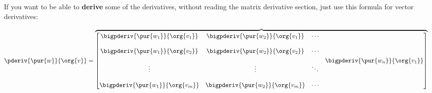         If you want to be able to \textbf{derive} some of the derivatives, without reading the matrix derivative section, just use this formula for vector derivatives:
        
        \begin{equation}
                \pderiv{ \pur{w} }{ \org{v} } 
                =
                \overbrace{
                    \begin{bmatrix}
                        \begin{matrix}
                            \bigpderiv{ \pur{w_1} }   { \org{v_1} }\\ 
                            \\
                            \bigpderiv{ \pur{w_1} }   { \org{v_2} }\\ 
                            \\
                            \vdots \\ 
                            \\
                            \bigpderiv{ \pur{w_1} }   { \org{v_m} }
                        \end{matrix} &
                        \begin{matrix}
                            \bigpderiv{ \pur{w_2} }   { \org{v_1} }\\ 
                            \\
                            \bigpderiv{ \pur{w_2} }   { \org{v_2} }\\ 
                            \\
                            \vdots \\ 
                            \\
                            \bigpderiv{ \pur{w_2} }   { \org{v_m} }
                        \end{matrix} &
                        \begin{matrix}
                            \cdots\\\\ \cdots \\\\ \ddots \\\\ \cdots
                        \end{matrix} &
                        \begin{matrix}
                            \bigpderiv{ \pur{w_n} }   { \org{v_1} }\\ 

\end{matrix}
\end{bmatrix}}
\end{equation}

